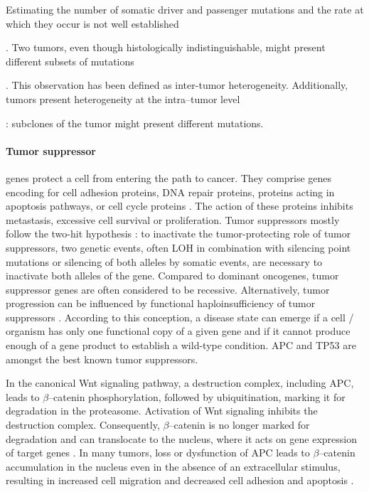       Estimating the number of somatic driver and passenger mutations and the
      rate at which they occur is not well established {\cite{driver_passenger}.
      Two tumors, even though histologically indistinguishable, might present
      different subsets of mutations {\cite{driver_passenger}
      {\cite{intertumor}}. This observation has been defined as inter-tumor
      heterogeneity. Additionally, tumors present heterogeneity at the
      intra--tumor level {\cite{intratumor}: subclones of the tumor might
      present different mutations.

      \paragraph{Tumor suppressor} genes protect a cell from entering the path
      to cancer. They comprise genes encoding for cell adhesion proteins,  DNA
      repair proteins, proteins acting in apoptosis pathways, or cell cycle
      proteins {\cite{tumor_supp}}. The action of these proteins inhibits metastasis, excessive cell
      survival or proliferation. Tumor suppressors mostly follow the two-hit
      hypothesis {\cite{two_hit}}: to inactivate the tumor-protecting role of tumor
      suppressors, two genetic events, often LOH in  combination with silencing
      point mutations or silencing of both alleles by somatic events, are
      necessary to inactivate both alleles of the gene.
      Compared to dominant oncogenes, tumor suppressor genes are often
      considered to be recessive. Alternatively, tumor progression can be
      influenced by functional haploinsufficiency of tumor suppressors {\cite{haploinsuff}}.
      According to this conception, a disease state can emerge if a cell /
      organism has only one functional copy of a given gene and if it cannot
      produce enough of a gene product to establish a wild-type condition. APC
      and TP53 are amongst the best known tumor suppressors.

      In the canonical Wnt signaling pathway, a destruction complex, including
      APC, leads to $\beta$--catenin phosphorylation, followed by
      ubiquitination, marking it for degradation in the proteasome. Activation
      of Wnt signaling inhibits the destruction complex.  Consequently,
      $\beta$--catenin is no longer marked for degradation and can translocate
      to the nucleus, where it acts on gene expression of target genes {\cite{wnt_signal}}. In many
      tumors, loss or dysfunction of APC leads to $\beta$--catenin accumulation
      in the nucleus even in the absence of an extracellular stimulus,
      resulting in increased cell migration and decreased cell adhesion and
      apoptosis {\cite{wnt_signal_2}}.

}}}

